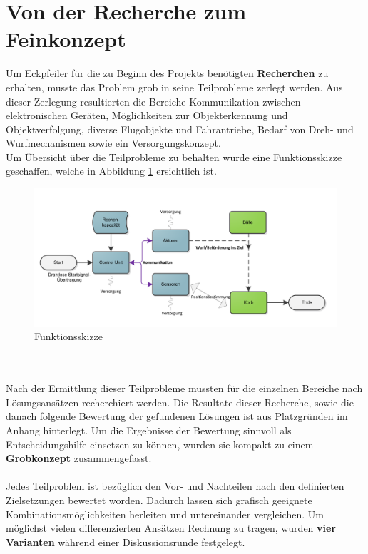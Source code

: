 \section{Von der Recherche zum Feinkonzept}
Um Eckpfeiler für die zu Beginn des Projekts benötigten \textbf{Recherchen} zu erhalten, musste das Problem grob in seine Teilprobleme zerlegt werden. Aus dieser Zerlegung resultierten die Bereiche Kommunikation zwischen elektronischen Geräten, Möglichkeiten zur Objekterkennung und Objektverfolgung, diverse Flugobjekte und Fahrantriebe, Bedarf von Dreh- und Wurfmechanismen sowie ein Versorgungskonzept. \\
Um Übersicht über die Teilprobleme zu behalten wurde eine Funktionsskizze geschaffen, welche in  Abbildung \ref{fig:Funktionsskizze} ersichtlich ist.\\
\begin{figure}[h!]
	\centering
	\includegraphics[width=1\textwidth]{Enddokumentation/Varianten/Bilder/Funktionsskizze.png}
	\caption{Funktionsskizze}
	\label{fig:Funktionsskizze}
\end{figure}
\\\\
Nach der Ermittlung dieser Teilprobleme mussten für die einzelnen Bereiche nach Lösungsansätzen recherchiert werden. Die Resultate dieser Recherche, sowie die danach folgende Bewertung der gefundenen Lösungen ist aus Platzgründen im Anhang hinterlegt. Um die Ergebnisse der Bewertung sinnvoll als Entscheidungshilfe einsetzen zu können, wurden sie kompakt zu einem \textbf{Grobkonzept} zusammengefasst.\\
\\
Jedes Teilproblem ist bezüglich den Vor- und Nachteilen nach den definierten Zielsetzungen bewertet worden. Dadurch lassen sich grafisch geeignete Kombinationsmöglichkeiten herleiten und untereinander vergleichen. Um möglichst vielen differenzierten Ansätzen Rechnung zu tragen, wurden \textbf{vier Varianten} während einer Diskussionsrunde festgelegt.\\
